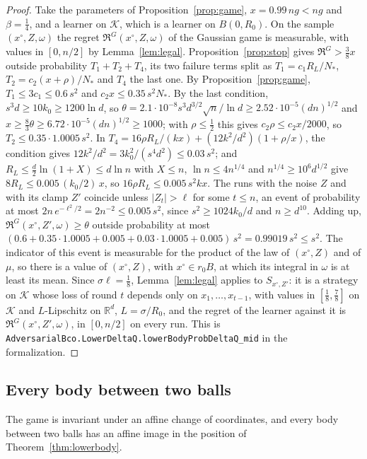 \documentclass[11pt]{amsart}
\theoremstyle{definition}
\numberwithin{equation}{section}
\newcommand{\R}{\mathbb{R}}
\newcommand{\cK}{\mathcal{K}}
\newcommand{\Reg}{\mathfrak{R}}
\begin{document}
\begin{proof}
Take the parameters of Proposition~\ref{prop:game}, $x=0.99\,ng<ng$ and $\beta=\frac14$, and a learner on $\cK$, which is a learner on $B(0,R_0)$. On the sample $(x^\circ,Z,\omega)$ the regret $\Reg^G(x^\circ,Z,\omega)$ of the Gaussian game is measurable, with values in $[0,n/2]$ by Lemma~\ref{lem:legal}. Proposition~\ref{prop:stop} gives $\Reg^G>\frac38x$ outside probability $T_1+T_2+T_4$, its two failure terms split as $T_1=c_1R_L/N_*$, $T_2=c_2(x+\rho)/N_*$ and $T_4$ the last one. By Proposition~\ref{prop:game}, $T_1\le3c_1\le0.6\,s^2$ and $c_2x\le0.35\,s^2N_*$. By the last condition, $s^3d\ge10k_0\ge1200\ln d$, so $\theta=2.1\cdot10^{-8}s^3d^{3/2}\sqrt n/\ln d\ge2.52\cdot10^{-5}(dn)^{1/2}$ and $x\ge\frac83\theta\ge6.72\cdot10^{-5}(dn)^{1/2}\ge1000$; with $\rho\le\frac12$ this gives $c_2\rho\le c_2x/2000$, so $T_2\le0.35\cdot1.0005\,s^2$. In $T_4=16\rho R_L/(kx)+(12k^2/d^2)(1+\rho/x)$, the condition gives $12k^2/d^2=3k_0^2/(s^4d^2)\le0.03\,s^2$; and $R_L\le\frac d2\ln(1+X)\le d\ln n$ with $X\le n$, $\ln n\le4n^{1/4}$ and $n^{1/4}\ge10^6d^{1/2}$ give $8R_L\le0.005\,(k_0/2)\,x$, so $16\rho R_L\le0.005\,s^2kx$. The runs with the noise $Z$ and with its clamp $Z'$ coincide unless $|Z_t|>\ell$ for some $t\le n$, an event of probability at most $2n\,e^{-\ell^2/2}=2n^{-2}\le0.005\,s^2$, since $s^2\ge1024k_0/d$ and $n\ge d^{10}$. Adding up, $\Reg^G(x^\circ,Z',\omega)\ge\theta$ outside probability at most $(0.6+0.35\cdot1.0005+0.005+0.03\cdot1.0005+0.005)\,s^2=0.99019\,s^2\le s^2$. The indicator of this event is measurable for the product of the law of $(x^\circ,Z)$ and of $\mu$, so there is a value of $(x^\circ,Z)$, with $x^\circ\in r_0B$, at which its integral in $\omega$ is at least its mean. Since $\sigma\ell=\frac18$, Lemma~\ref{lem:legal} applies to $S_{x^\circ,Z'}$: it is a strategy on $\cK$ whose loss of round $t$ depends only on $x_1,\dots,x_{t-1}$, with values in $[\frac18,\frac78]$ on $\cK$ and $L$-Lipschitz on $\R^d$, $L=\sigma/R_0$, and the regret of the learner against it is $\Reg^G(x^\circ,Z',\omega)$, in $[0,n/2]$ on every run.
This is \texttt{AdversarialBco.LowerDeltaQ.lowerBodyProbDeltaQ\_mid} in the formalization.
\end{proof}

\subsection{Every body between two balls}\label{sec:lower-bodies}

The game is invariant under an affine change of coordinates, and every body between two balls has an affine image in the position of Theorem~\ref{thm:lowerbody}.
\end{document}
